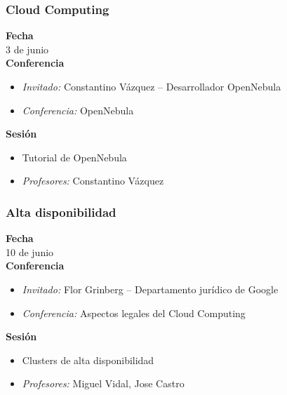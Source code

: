 \documentclass{beamer}
\begin{document}
\begin{frame}
  \frametitle{Cloud Computing}
  \textbf{Fecha}\\
  \hspace{0.3cm}3 de junio\\
  \textbf{Conferencia}
    \begin{itemize}
      \item \textit{Invitado:} Constantino Vázquez -- Desarrollador OpenNebula
      \item \textit{Conferencia:} OpenNebula
    \end{itemize}
  \textbf{Sesión}
    \begin{itemize}
      \item Tutorial de OpenNebula
      \item \textit{Profesores:} Constantino Vázquez
    \end{itemize}
\end{frame}

\begin{frame}
  \frametitle{Alta disponibilidad}
  \textbf{Fecha}\\
  \hspace{0.3cm}10 de junio\\
  \textbf{Conferencia}
    \begin{itemize}
      \item \textit{Invitado:} Flor Grinberg -- Departamento jurídico de Google
      \item \textit{Conferencia:} Aspectos legales del Cloud Computing
    \end{itemize}
  \textbf{Sesión}
    \begin{itemize}
      \item Clusters de alta disponibilidad
      \item \textit{Profesores:} Miguel Vidal, Jose Castro
    \end{itemize}
\end{frame}
\end{document}
